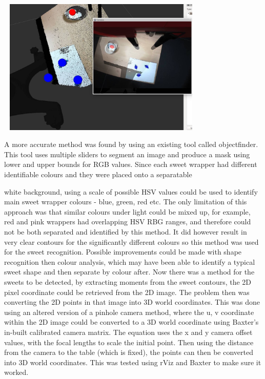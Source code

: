 \begin{minipage}[t]{0.64\textwidth}
\smallskip
\centering
\includegraphics[width = 10cm, height = 6.5cm]{sweettransformation.jpg}
\centering
{}
\bigskip
\end{minipage}
\hspace{0.5cm}
\begin{minipage}[t]{0.29\textwidth}
\raggedright
A more accurate method was found by using an existing tool called objectfinder. This tool uses multiple sliders to segment an image and produce a mask using lower and upper bounds for RGB values. Since each sweet wrapper had different identifiable colours and they were placed onto a separatable 
\end{minipage}	
white background, using a scale of possible HSV values could be used to identify main sweet wrapper colours - blue, green, red etc. The only limitation of this approach was that similar colours under light could be mixed up, for example, red and pink wrappers had overlapping HSV RBG ranges, and therefore could not be both separated and identified by this method. It did however result in very clear contours for the significantly different colours so this method was used for the sweet recognition. Possible improvements could be made with shape recognition then colour analysis, which may have been able to identify a typical sweet shape and then separate by colour after.
\newline
\newline
Now there was a method for the sweets to be detected, by extracting moments from the sweet contours, the 2D pixel coordinate could be retrieved from the 2D image. The problem then was converting the 2D points in that image into 3D world coordinates. 
This was done using an altered version of a pinhole camera method, where the u, v coordinate within the 2D image could be converted to a 3D world coordinate using Baxter's in-built calibrated camera matrix. The equation uses the x and y camera offset values, with the focal lengths to scale the initial point. Then using the distance from the camera to the table (which is fixed), the points can then be converted into 3D world coordinates. This was tested using rViz and Baxter to make sure it worked.
